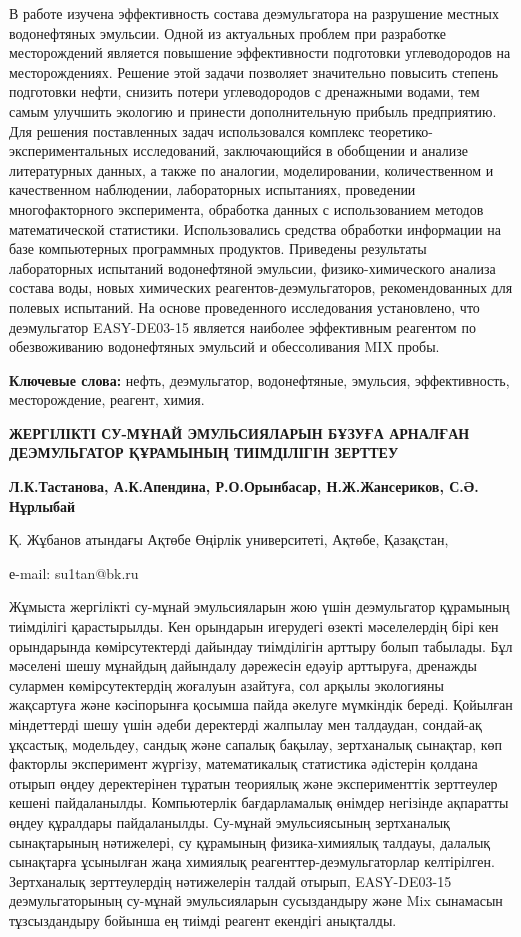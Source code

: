 В работе изучена эффективность состава деэмульгатора на разрушение
местных водонефтяных эмульсии. Одной из актуальных проблем при
разработке месторождений является повышение эффективности подготовки
углеводородов на месторождениях. Решение этой задачи позволяет
значительно повысить степень подготовки нефти, снизить потери
углеводородов с дренажными водами, тем самым улучшить экологию и
принести дополнительную прибыль предприятию. Для решения поставленных
задач использовался комплекс теоретико-экспериментальных исследований,
заключающийся в обобщении и анализе литературных данных, а также по
аналогии, моделировании, количественном и качественном наблюдении,
лабораторных испытаниях, проведении многофакторного эксперимента,
обработка данных с использованием методов математической статистики.
Использовались средства обработки информации на базе компьютерных
программных продуктов. Приведены результаты лабораторных испытаний
водонефтяной эмульсии, физико-химического анализа состава воды, новых
химических реагентов-деэмульгаторов, рекомендованных для полевых
испытаний. На основе проведенного исследования установлено, что
деэмульгатор EASY-DE03-15 является наиболее эффективным реагентом по
обезвоживанию водонефтяных эмульсий и обессоливания MIX пробы.

{\bfseries Ключевые слова:} нефть, деэмульгатор, водонефтяные, эмульсия,
эффективность, месторождение, реагент, химия.

\begin{center}
{\large\bfseries ЖЕРГІЛІКТІ СУ-МҰНАЙ ЭМУЛЬСИЯЛАРЫН БҰЗУҒА АРНАЛҒАН ДЕЭМУЛЬГАТОР
ҚҰРАМЫНЫҢ ТИІМДІЛІГІН ЗЕРТТЕУ}

{\bfseries Л.К.Тастанова, А.К.Апендина, Р.О.Орынбасар, Н.Ж.Жансериков, С.Ә. Нұрлыбай}

Қ. Жұбанов атындағы Ақтөбе Өңірлік университеті, Ақтөбе, Қазақстан,

е-mail: su1tan@bk.ru
\end{center}

Жұмыста жергілікті су-мұнай эмульсияларын жою үшін деэмульгатор
құрамының тиімділігі қарастырылды. Кен орындарын игерудегі өзекті
мәселелердің бірі кен орындарында көмірсутектерді дайындау тиімділігін
арттыру болып табылады. Бұл мәселені шешу мұнайдың дайындалу дәрежесін
едәуір арттыруға, дренажды сулармен көмірсутектердің жоғалуын азайтуға,
сол арқылы экологияны жақсартуға және кәсіпорынға қосымша пайда әкелуге
мүмкіндік береді. Қойылған міндеттерді шешу үшін әдеби деректерді
жалпылау мен талдаудан, сондай-ақ ұқсастық, модельдеу, сандық және
сапалық бақылау, зертханалық сынақтар, көп факторлы эксперимент жүргізу,
математикалық статистика әдістерін қолдана отырып өңдеу деректерінен
тұратын теориялық және эксперименттік зерттеулер кешені пайдаланылды.
Компьютерлік бағдарламалық өнімдер негізінде ақпаратты өңдеу құралдары
пайдаланылды. Су-мұнай эмульсиясының зертханалық сынақтарының
нәтижелері, су құрамының физика-химиялық талдауы, далалық сынақтарға
ұсынылған жаңа химиялық реагенттер-деэмульгаторлар келтірілген.
Зертханалық зерттеулердің нәтижелерін талдай отырып, EASY-DE03-15
деэмульгаторының су-мұнай эмульсияларын сусыздандыру және Mix сынамасын
тұзсыздандыру бойынша ең тиімді реагент екендігі анықталды.


